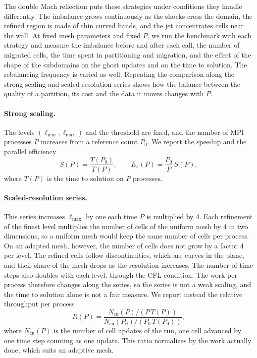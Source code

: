 The double Mach reflection puts these strategies under conditions they handle
differently. The imbalance grows continuously as the shocks cross the domain,
the refined region is made of thin curved bands, and the jet concentrates cells
near the wall. At fixed mesh parameters and fixed $P$, we run the benchmark with
each strategy and measure the imbalance before and after each call, the number
of migrated cells, the time spent in partitioning and migration, and the effect
of the shape of the subdomains on the ghost updates and on the time to
solution. The rebalancing frequency is varied as well. Repeating the
comparison along the strong scaling and scaled-resolution series shows how the
balance between the quality of a partition, its cost and the data it moves changes
with $P$.

\paragraph{Strong scaling.}
The levels $(\ell_{\min}, \ell_{\max})$ and the threshold are fixed, and the
number of MPI processes $P$ increases from a reference count $P_0$. We report
the speedup and the parallel efficiency
\begin{equation}\label{eq:specs:samurai:dmr:strong}
  S(P) = \frac{T(P_0)}{T(P)}, \qquad E_s(P) = \frac{P_0}{P}\,S(P),
\end{equation}
where $T(P)$ is the time to solution on $P$ processes.

\paragraph{Scaled-resolution series.}
This series increases $\ell_{\max}$ by one each time $P$ is multiplied by 4.
Each refinement of the finest level multiplies the number of cells of the
uniform mesh by 4 in two dimensions, so a uniform mesh would keep the same
number of cells per process. On an adapted mesh, however, the number of cells
does not grow by a factor 4 per level. The refined cells follow
discontinuities, which are curves in the plane, and their share of the mesh
drops as the resolution increases. The number of time steps also doubles with
each level, through the CFL condition. The work per process therefore changes
along the series, so the series is not a weak scaling, and the time to
solution alone is not a fair measure. We report instead the relative throughput
per process
\begin{equation}\label{eq:specs:samurai:dmr:throughput}
  R(P) = \frac{N_{\mathrm{cu}}(P) / \left(P\, T(P)\right)}{N_{\mathrm{cu}}(P_0) / \left(P_0\, T(P_0)\right)},
\end{equation}
where $N_{\mathrm{cu}}(P)$ is the number of cell updates of the run, one cell
advanced by one time step counting as one update. This ratio normalizes by the
work actually done, which suits an adaptive mesh.

